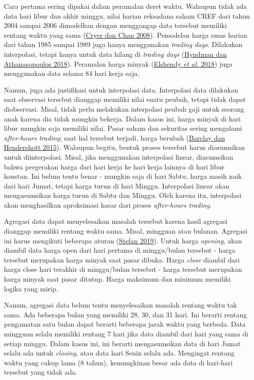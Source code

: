 \documentclass[
]{book}
\begin{document}
Cara pertama sering dipakai dalam peramalan deret waktu. Walaupun tidak ada data hari libur dan akhir minggu, nilai harian reksadana saham CREF dari tahun 2004 sampai 2006 dimodelkan dengan menggangap data tersebut memiliki rentang waktu yang sama (\protect\hyperlink{ref-cryer_time_2008}{Cryer dan Chan 2008}). Pemodelan harga emas harian dari tahun 1985 sampai 1989 juga hanya menggunakan \emph{trading days}. Dilakukan interpolasi, tetapi hanya untuk data hilang di \emph{trading days} (\protect\hyperlink{ref-fpp2}{Hyndman dan Athanasopoulos 2018}). Peramalan harga minyak (\protect\hyperlink{ref-fouroil}{Elshendy \emph{et al.} 2018}) juga menggunakan data selama 84 hari kerja saja.

Namun, juga ada justifikasi untuk interpolasi data. Interpolasi data dilakukan saat observasi tersebut dianggap memiliki nilai suatu peubah, tetapi tidak dapat diobservasi. Misal, tidak perlu melakukan interpolasi peubah gaji untuk seorang anak karena dia tidak mungkin bekerja. Dalam kasus ini, harga minyak di hari libur mungkin saja memiliki nilai. Pasar saham dan sekuritas sering mengalami \emph{after-hours trading}; saat hal tersebut terjadi, harga berubah (\protect\hyperlink{ref-barclay_price_2015}{Barclay dan Hendershott 2015}). Walaupun begitu, bentuk proses tersebut harus diasumsikan untuk diinterpolasi. Misal, jika menggunakan interpolasi linear, diasumsikan bahwa pergerakan harga dari hari kerja ke hari kerja lainnya di hari libur konstan. Ini belum tentu benar - mungkin saja di hari Sabtu, harga masih naik dari hari Jumat, tetapi harga turun di hari Minggu. Interpolasi linear akan mengasumsikan harga turun di Sabtu dan Minggu. Oleh karena itu, interpolasi akan menghasilkan aproksimasi kasar dari proses \emph{after-hours trading}.

Agregasi data dapat menyelesaikan masalah tersebut karena hasil agregasi dianggap memiliki rentang waktu sama. Misal, mingguan atau bulanan. Agregasi ini harus mengikuti beberapa aturan (\protect\hyperlink{ref-soverflow}{Stefan 2019}). Untuk harga \emph{opening}, akan diambil data harga open dari hari pertama di minggu/bulan tersebut - harga tersebut merupakan harga minyak saat pasar dibuka. Harga \emph{close} diambil dari harga close hari terakhir di minggu/bulan tersebut - harga tersebut merupakan harga minyak saat pasar ditutup. Harga maksimum dan minimum memiliki logika yang mirip.

Namun, agregasi data belum tentu menyelesaikan masalah rentang waktu tak sama. Ada beberapa bulan yang memiliki 28, 30, dan 31 hari. Ini berarti rentang pengamatan satu bulan dapat berarti beberapa jarak waktu yang berbeda. Data mingguan selalu memiliki rentang 7 hari jika data diambil dari hari yang sama di setiap minggu. Dalam kasus ini, ini berarti mengasumsikan data di hari Jumat selalu ada untuk \emph{closing}, atau data hari Senin selalu ada. Mengingat rentang waktu yang cukup lama (8 tahun), kemungkinan besar ada data di hari-hari tersebut yang tidak ada.
\end{document}
